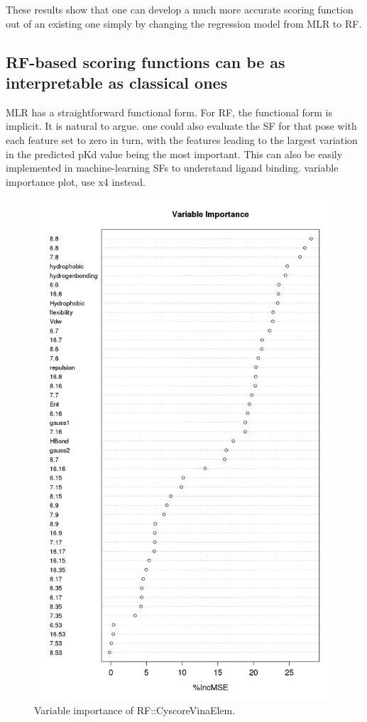 \documentclass[journal=jacsat,manuscript=article]{achemso}
\begin{document}
These results show that one can develop a much more accurate scoring function out of an existing one simply by changing the regression model from MLR to RF.

\subsection{RF-based scoring functions can be as interpretable as classical ones}

MLR has a straightforward functional form. For RF, the functional form is implicit. It is natural to argue.
one could also evaluate the SF for that pose with each feature set to zero in turn, with the features leading to the largest variation in the predicted pKd value being the most important. This can also be easily implemented in machine-learning SFs to understand ligand binding.
variable importance plot, use x4 instead.

\begin{figure}
\includegraphics[width=0.8\linewidth,natwidth=960,natheight=1600]{../rfcyscore/x46/rf/trn-2280.png}
\caption{Variable importance of RF::CyscoreVinaElem.}
\label{fig:varimp}
\end{figure}
\end{document}
